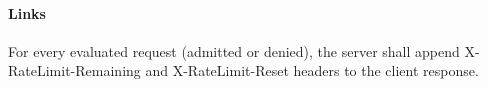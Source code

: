 \label{SR-402}
\paragraph{Links} 

For every evaluated request (admitted or denied),
the server shall append X-RateLimit-Remaining and X-RateLimit-Reset headers
to the client response.